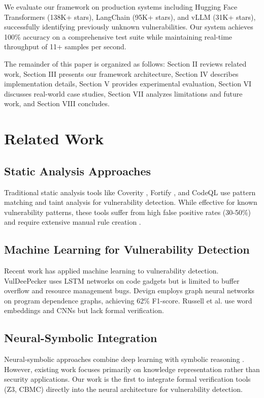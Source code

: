 \documentclass[10pt,journal,compsoc]{IEEEtran}
\begin{document}
We evaluate our framework on production systems including Hugging Face Transformers (138K+ stars), LangChain (95K+ stars), and vLLM (31K+ stars), successfully identifying previously unknown vulnerabilities. Our system achieves 100\% accuracy on a comprehensive test suite while maintaining real-time throughput of 11+ samples per second.

The remainder of this paper is organized as follows: Section II reviews related work, Section III presents our framework architecture, Section IV describes implementation details, Section V provides experimental evaluation, Section VI discusses real-world case studies, Section VII analyzes limitations and future work, and Section VIII concludes.

\section{Related Work}

\subsection{Static Analysis Approaches}
Traditional static analysis tools like Coverity \cite{bessey2010coverity}, Fortify \cite{chess2004static}, and CodeQL \cite{avgustinov2016ql} use pattern matching and taint analysis for vulnerability detection. While effective for known vulnerability patterns, these tools suffer from high false positive rates (30-50\%) and require extensive manual rule creation \cite{johnson2013static}.

\subsection{Machine Learning for Vulnerability Detection}
Recent work has applied machine learning to vulnerability detection. VulDeePecker \cite{li2018vuldeepecker} uses LSTM networks on code gadgets but is limited to buffer overflow and resource management bugs. Devign \cite{zhou2019devign} employs graph neural networks on program dependence graphs, achieving 62\% F1-score. Russell et al. \cite{russell2018automated} use word embeddings and CNNs but lack formal verification.

\subsection{Neural-Symbolic Integration}
Neural-symbolic approaches combine deep learning with symbolic reasoning \cite{garcez2019neural}. However, existing work focuses primarily on knowledge representation rather than security applications. Our work is the first to integrate formal verification tools (Z3, CBMC) directly into the neural architecture for vulnerability detection.
\end{document}
